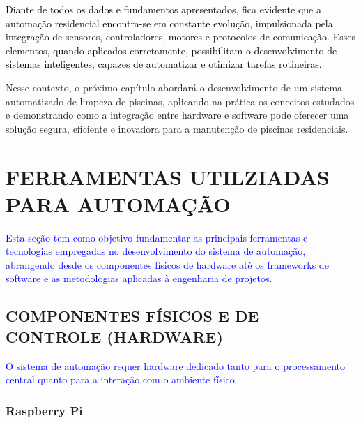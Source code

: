     \textcolor{black}{Diante de todos os dados e fundamentos apresentados, fica evidente que a automação residencial encontra-se em constante evolução, impulsionada pela integração de sensores, controladores, motores e protocolos de comunicação. Esses elementos, quando aplicados corretamente, possibilitam o desenvolvimento de sistemas inteligentes, capazes de automatizar e otimizar tarefas rotineiras.}

    Nesse contexto, o próximo capítulo abordará o desenvolvimento de um sistema automatizado de limpeza de piscinas, aplicando na prática os conceitos estudados e demonstrando como a integração entre hardware e software pode oferecer uma solução segura, eficiente e inovadora para a manutenção de piscinas residenciais.

\section{FERRAMENTAS UTILZIADAS PARA AUTOMAÇÃO}

    \textcolor{blue}{Esta seção tem como objetivo fundamentar as principais ferramentas e tecnologias empregadas no desenvolvimento do sistema de automação, abrangendo desde os componentes físicos de hardware até os frameworks de software e as metodologias aplicadas à engenharia de projetos.}

    \subsection{COMPONENTES FÍSICOS E DE CONTROLE (HARDWARE)}

        \textcolor{blue}{O sistema de automação requer hardware dedicado tanto para o processamento central quanto para a interação com o ambiente físico.}

        \subsubsection*{Raspberry Pi}
        
